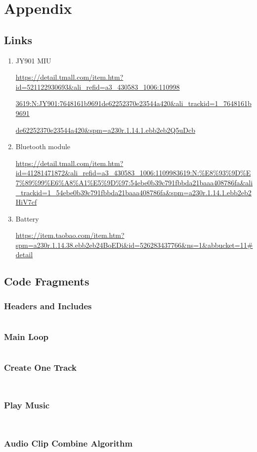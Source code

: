 \section{Appendix}

\subsection{Links}

\begin{enumerate}
\item JY901 MIU

\url{https://detail.tmall.com/item.htm?id=521122930693&ali_refid=a3_430583_1006:110998}

\url{3619:N:JY901:7648161b9691de62252370e23544a420&ali_trackid=1_7648161b9691}

\url{ de62252370e23544a420&spm=a230r.1.14.1.ebb2eb2Q5uDcb} 

\item  Bluetooth module 

\url{https://detail.tmall.com/item.htm?id=41281471872&ali_refid=a3_430583_1006:1109983619:N:%E8%93%9D%E7%89%99%E6%A8%A1%E5%9D%97:54ebe0b39c791fbbda21baaa408786fa&ali_trackid=1_54ebe0b39c791fbbda21baaa408786fa&spm=a230r.1.14.1.ebb2eb2HiV7cf}
\item  Battery 

\url{https://item.taobao.com/item.htm?spm=a230r.1.14.38.ebb2eb24BoEDi&id=526283437766&ns=1&abbucket=11#detail} 

\end{enumerate}

\newpage

\subsection{Code Fragments}

\subsubsection{Headers and Includes}
\inputminted{csharp}{scr/Headers.cs}


\subsubsection{Main Loop}
\inputminted{csharp}{scr/OnGui.cs}

\newpage

\subsubsection{Create One Track}
\inputminted{csharp}{scr/CreateOneTrack.cs}
\newpage
\inputminted{csharp}{scr/cot2.cs}


\subsubsection{Play Music}
\inputminted{csharp}{scr/PlayMusic.cs}
\newpage
\inputminted{csharp}{scr/pm2.cs}


\subsubsection{Audio Clip Combine Algorithm}
\inputminted{csharp}{scr/ACCombine.cs}
\newpage
\inputminted{csharp}{scr/acc2.cs}

